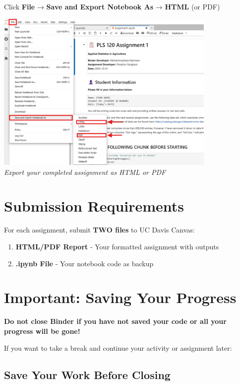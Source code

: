 \documentclass[11pt,a4paper]{article}
\begin{document}
Click \textbf{File} → \textbf{Save and Export Notebook As} → \textbf{HTML} (or PDF)

\begin{center}
\includegraphics[width=0.8\textwidth]{../Image_10.png}\\
\textit{Export your completed assignment as HTML or PDF}
\end{center}

\section{Submission Requirements}

For each assignment, submit \textbf{TWO files} to UC Davis Canvas:

\begin{enumerate}
    \item \textbf{HTML/PDF Report} - Your formatted assignment with outputs
    \item \textbf{.ipynb File} - Your notebook code as backup
\end{enumerate}

\section{Important: Saving Your Progress}

\begin{warningbox}
\textbf{Do not close Binder if you have not saved your code or all your progress will be gone!}
\end{warningbox}

If you want to take a break and continue your activity or assignment later:

\subsection{Save Your Work Before Closing}
\end{document}

